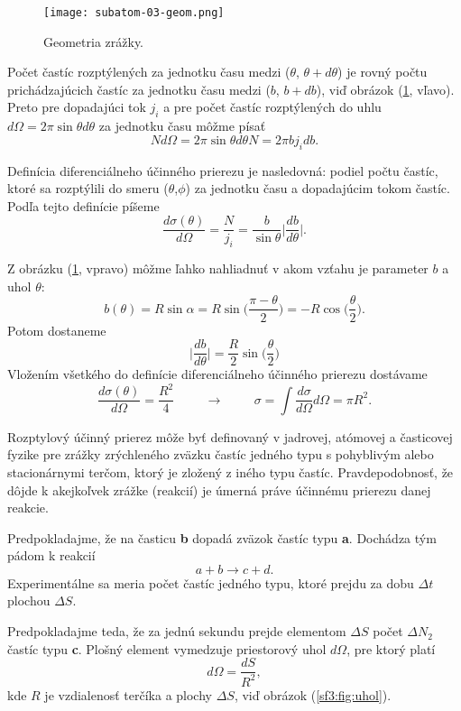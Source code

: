 \documentclass[../../main.tex]{subfiles}
\begin{document}
\begin{figure}[!h]
\texttt{[image: subatom-03-geom.png]}
\centering
\caption{Geometria zrážky.}
\label{sf3:fig:geom}
\end{figure}

Počet častíc rozptýlených za jednotku času medzi ($\theta$, $\theta + d\theta$) je rovný počtu prichádzajúcich častíc za jednotku času medzi ($b$, $b+ db$), viď obrázok (\ref{sf3:fig:geom}, vľavo). Preto pre dopadajúci tok $j_i$ a pre počet častíc rozptýlených do uhlu $d\Omega=2\pi \sin\theta d\theta$ za jednotku času môžme písať
$$ Nd\Omega = 2\pi \sin\theta d\theta N = 2\pi b j_i db .$$

Definícia diferenciálneho účinného prierezu je nasledovná: podiel počtu častíc, ktoré sa rozptýlili do smeru ($\theta$,$\phi$) za jednotku času a dopadajúcim tokom častíc. Podľa tejto definície píšeme
$$ \frac{d\sigma(\theta)}{d\Omega} = \frac{N}{j_i} = \frac{b}{\sin\theta} \bigg\vert \frac{db}{d\theta} \bigg\vert. $$

Z obrázku (\ref{sf3:fig:geom}, vpravo) môžme ľahko nahliadnuť v akom vzťahu je parameter $b$ a uhol $\theta$:
$$ b(\theta)=R\sin\alpha = R\sin\bigg(\frac{\pi - \theta}{2} \bigg)=-R\cos\bigg(\frac{\theta}{2} \bigg). $$
Potom dostaneme
$$ \bigg\vert \frac{db}{d\theta} \bigg\vert = \frac{R}{2}\sin\bigg(\frac{\theta}{2} \bigg) $$
Vložením všetkého do definície diferenciálneho účinného prierezu dostávame
$$ \frac{d\sigma(\theta)}{d\Omega} = \frac{R^2}{4} \hspace{1cm} \rightarrow \hspace{1cm} \sigma = \int \frac{d\sigma}{d\Omega}d\Omega=\pi R^2.$$

Rozptylový účinný prierez môže byť definovaný v jadrovej, atómovej a časticovej fyzike pre zrážky zrýchleného zväzku častíc jedného typu s pohyblivým alebo stacionárnymi terčom, ktorý je zložený z iného typu častíc. Pravdepodobnosť, že dôjde k akejkoľvek zrážke (reakcií) je úmerná práve účinnému prierezu danej reakcie. 

Predpokladajme, že na časticu \textbf{b} dopadá zväzok častíc typu \textbf{a}. Dochádza tým pádom k reakcií
$$ a+b \rightarrow c+d.$$
Experimentálne sa meria počet častíc jedného typu, ktoré prejdu za dobu $\Delta t$ plochou $\Delta S$.

Predpokladajme teda, že za jednú sekundu prejde elementom $\Delta S$ počet $\Delta N_2$ častíc typu \textbf{c}. Plošný element vymedzuje priestorový uhol $d\Omega$, pre ktorý platí
$$ d\Omega = \frac{dS}{R^2},$$ 
kde $R$ je vzdialenosť terčíka a plochy $\Delta S$, viď obrázok (\ref{sf3:fig:uhol}).
\end{document}
